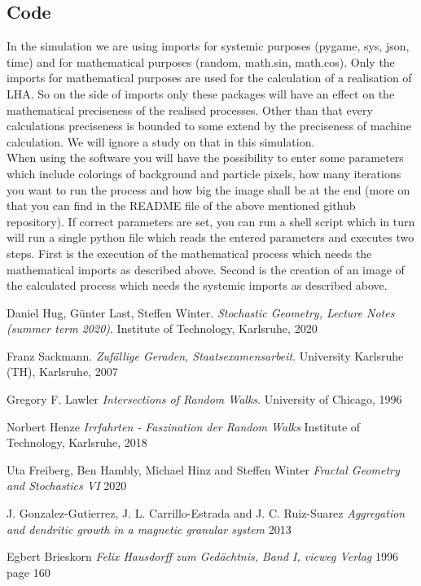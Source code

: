 \documentclass[12pt,a4paper]{scrartcl}
\numberwithin{equation}{subsection}
\newcommand{\1}{\mathbbm{1}}
\numberwithin{equation}{section}
\theoremstyle{definition}
\begin{document}
\subsection{Code}
In the simulation we are using imports for systemic purposes (pygame, sys, json, time) and for mathematical purposes (random, math.sin, math.cos). Only the imports for mathematical purposes are used for the calculation of a realisation of LHA. So on the side of imports only these packages will have an effect on the mathematical preciseness of the realised processes. Other than that every calculations preciseness is bounded to some extend by the preciseness of machine calculation. We will ignore a study on that in this simulation. \\
When using the software you will have the possibility to enter some parameters which include colorings of background and particle pixels, how many iterations you want to run the process and how big the image shall be at the end (more on that you can find in the README file of the above mentioned github repository). If correct parameters are set, you can run a shell script which in turn will run a single python file which reads the entered parameters and executes two steps. First is the execution of the mathematical process which needs the mathematical imports as described above. Second is the creation of an image of the calculated process which needs the systemic imports as described above. 



\newpage




\begin{thebibliography}{biblio}
\thispagestyle{empty}

Daniel Hug, Günter Last, Steffen Winter.
\emph{Stochastic Geometry, 	Lecture Notes (summer term 2020)}.
Institute of Technology, Karlsruhe, 2020

Franz Sackmann. 
\emph{Zufällige Geraden, Staatsexamensarbeit}.
University Karlsruhe (TH), Karlsruhe, 2007

Gregory F. Lawler
\emph{Intersections of Random Walks}.
University of Chicago, 1996

Norbert Henze
\emph{Irrfahrten - Faszination der Random Walks}
Institute of Technology, Karlsruhe, 2018

Uta Freiberg, Ben Hambly, Michael Hinz and Steffen Winter
\emph{Fractal Geometry and Stochastics VI}
2020

J. Gonzalez-Gutierrez, J. L. Carrillo-Estrada and J. C. Ruiz-Suarez
\emph{Aggregation and dendritic growth in a magnetic granular system}
2013

Egbert Brieskorn
\emph{Felix Hausdorff zum Gedächtnis, Band I, vieweg Verlag}
1996
page 160



\end{thebibliography}
\end{document}

